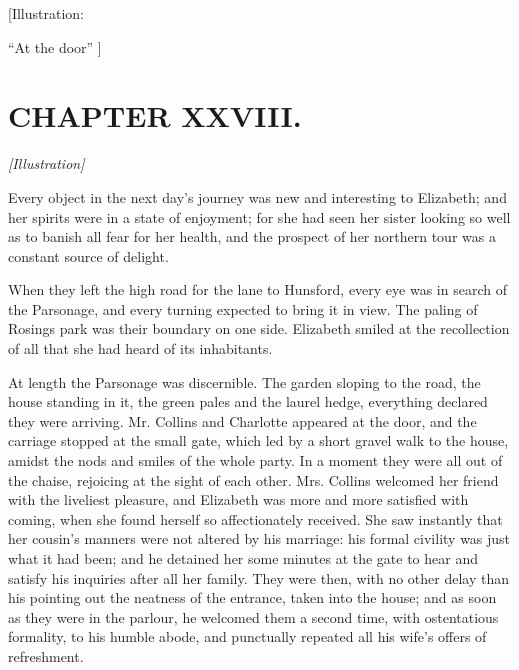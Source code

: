 \documentclass[12pt]{book}
\begin{document}
[Illustration:

``At the door'' ]

\chapter{CHAPTER XXVIII.}

\emph{[Illustration]}

Every object in the next day's journey was new and interesting to Elizabeth; and her spirits were in a state of enjoyment; for she had seen her sister looking so well as to banish all fear for her health, and the prospect of her northern tour was a constant source of delight.

When they left the high road for the lane to Hunsford, every eye was in search of the Parsonage, and every turning expected to bring it in view. The paling of Rosings park was their boundary on one side. Elizabeth smiled at the recollection of all that she had heard of its inhabitants.

At length the Parsonage was discernible. The garden sloping to the road, the house standing in it, the green pales and the laurel hedge, everything declared they were arriving. Mr. Collins and Charlotte appeared at the door, and the carriage stopped at the small gate, which led by a short gravel walk to the house, amidst the nods and smiles of the whole party. In a moment they were all out of the chaise, rejoicing at the sight of each other. Mrs. Collins welcomed her friend with the liveliest pleasure, and Elizabeth was more and more satisfied with coming, when she found herself so affectionately received. She saw instantly that her cousin's manners were not altered by his marriage: his formal civility was just what it had been; and he detained her some minutes at the gate to hear and satisfy his inquiries after all her family. They were then, with no other delay than his pointing out the neatness of the entrance, taken into the house; and as soon as they were in the parlour, he welcomed them a second time, with ostentatious formality, to his humble abode, and punctually repeated all his wife's offers of refreshment.
\end{document}
